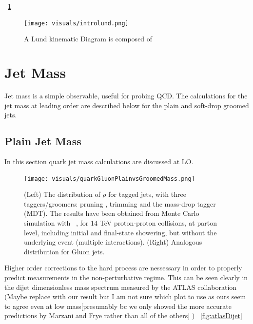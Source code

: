    ~\ref{fig:introlund}




\begin{figure}[htb]
\centering
\texttt{[image: visuals/introlund.png]}
\caption{A Lund kinematic Diagram is composed of }
\label{fig:introlund}
\end{figure}









\section{Jet Mass}\label{sec:jetmass}


Jet mass is a simple observable, useful for probing QCD. The calculations for the jet mass at leading order are described below for the plain and soft-drop groomed jets.

\subsection{Plain Jet Mass}\label{sec:jetmass}


In this section quark jet mass calculations are discussed at LO. 




\begin{figure}[htb]
\centering
\texttt{[image: visuals/quarkGluonPlainvsGroomedMass.png]}
\caption{(Left) The distribution of $\rho$ for tagged jets, with three taggers/groomers: pruning , trimming and the mass-drop tagger (MDT). The results have been obtained from Monte Carlo simulation with ~\cite{Sjostrand:2014zea}, for 14 TeV proton-proton collisions, at parton level, including initial and final-state showering, but without the underlying event (multiple interactions). (Right) Analogous distribution for Gluon jets.~\cite{mmdt}}
\label{fig:quarkGluonPlainvsGroomedMass}
\end{figure}




















Higher order corrections to the hard process are nessessary in order to properly predict measurements in the non-perturbative regime. This can be seen clearly in the dijet dimensionless mass spectrum measured by the ATLAS collaboration (Maybe replace with our result but I am not sure which plot to use as ours seem to agree even at low mass[presumably bc we only showed the more accurate predictions by Marzani and Frye rather than all of the others] ) ~\ref{fig:atlasDijet}


